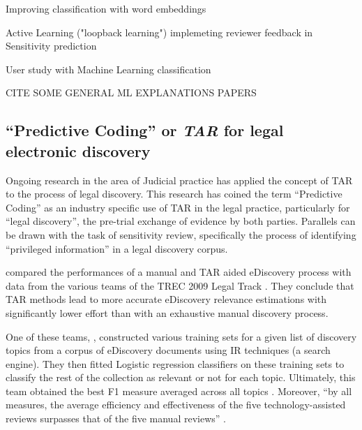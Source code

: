 \documentclass{l4proj}
\begin{document}
\autocite{jose_enhancing_2017} Improving classification with word embeddings

\autocite{pasi_active_2018} Active Learning ("loopback learning") implemeting reviewer feedback in Sensitivity prediction

\autocite{mcdonaldHowSensitivityClassification2019} User study with Machine Learning classification

CITE SOME GENERAL ML EXPLANATIONS PAPERS

\subsection{``Predictive Coding'' or \textit{TAR} for legal electronic discovery}

Ongoing research in the area of Judicial practice has applied the concept of TAR to the process of legal discovery.
This research has coined the term ``Predictive Coding'' \autocite{carrollGrossmancormackGlossaryTechnologyassisted2013} as an industry specific use of TAR in the legal practice, particularly for ``legal discovery'', the pre-trial exchange of evidence by both parties.
Parallels can be drawn with the task of sensitivity review, specifically the process of identifying ``privileged information'' in a legal discovery corpus.

\textcite{grossmanTechnologyAssistedReviewEDiscovery2010} compared the performances of a manual and TAR aided eDiscovery process with data from the various teams of the TREC 2009 Legal Track \autocite{hedinOverviewTREC2009}.
They conclude that TAR methods lead to more accurate eDiscovery relevance estimations with significantly lower effort than with an exhaustive manual discovery process.


One of these teams, \textcite{cormackMachineLearningInformation2009}, constructed various training sets for a given list of discovery topics from a corpus of eDiscovery documents using IR techniques (a search engine).
They then fitted Logistic regression classifiers on these training sets to classify the rest of the collection as relevant or not for each topic.
Ultimately, this team obtained the best F1 measure averaged across all topics \autocite{hedinOverviewTREC2009}.
Moreover, ``by all measures, the average efficiency and effectiveness of the five technology-assisted reviews surpasses that of the five manual reviews'' \autocite[p.~43]{grossmanTechnologyAssistedReviewEDiscovery2010}.
\end{document}
